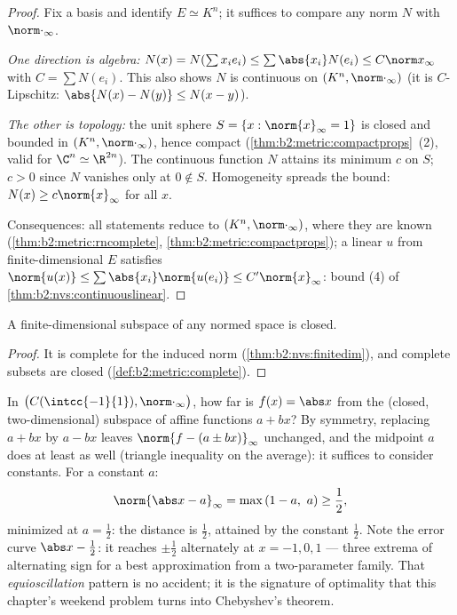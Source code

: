 \begin{proof}
Fix a basis and identify $E \simeq K^n$; it suffices to compare any
norm $N$ with $\norm\cdot_\infty$.

\emph{One direction is algebra:} $N(x) = N(\sum x_i e_i) \leq
\sum \abs{x_i} N(e_i) \leq C \norm x_\infty$ with $C = \sum N(e_i)$.
This also shows $N$ is continuous on $(K^n, \norm\cdot_\infty)$
(it is $C$-Lipschitz: $\abs{N(x) - N(y)} \leq N(x - y)$).

\emph{The other is topology:} the unit sphere $S = \{x :
\norm{x}_\infty = 1\}$ is closed and bounded in $(K^n,
\norm\cdot_\infty)$, hence compact
(\cref{thm:b2:metric:compactprops}~(2), valid for $\C^n \simeq
\R^{2n}$). The continuous function $N$ attains its minimum $c$ on
$S$; $c > 0$ since $N$ vanishes only at $0 \notin S$. Homogeneity
spreads the bound: $N(x) \geq c \norm{x}_\infty$ for all $x$.

Consequences: all statements reduce to $(K^n,
\norm\cdot_\infty)$, where they are known
(\cref{thm:b2:metric:rncomplete},
\cref{thm:b2:metric:compactprops}); a linear $u$ from
finite-dimensional $E$ satisfies $\norm{u(x)} \leq \sum\abs{x_i}
\norm{u(e_i)} \leq C'\norm{x}_\infty$: bound (4) of
\cref{thm:b2:nvs:continuouslinear}.
\end{proof}

\begin{corollary}\label{cor:b2:nvs:closedsubspace}
A finite-dimensional subspace of any normed space is closed.
\end{corollary}

\begin{proof}
It is complete for the induced norm
(\cref{thm:b2:nvs:finitedim}), and complete subsets are closed
(\cref{def:b2:metric:complete}).
\end{proof}

\begin{example}\label{ex:b2:nvs:bestaffine}
In $\bigl(C(\intcc{-1}{1}), \norm\cdot_\infty\bigr)$, how far is
$f(x) = \abs x$ from the (closed, two-dimensional) subspace of
affine functions $a + bx$? By symmetry, replacing $a + bx$ by
$a - bx$ leaves $\norm{f - (a \pm bx)}_\infty$ unchanged, and
the midpoint $a$ does at least as well (triangle inequality on
the average): it suffices to consider constants. For a constant
$a$:
\[
\norm{\abs x - a}_\infty = \max\,(1 - a,\ a)
\geq \frac12 ,
\]
minimized at $a = \frac12$: the distance is $\frac12$, attained
by the constant $\frac12$. Note the error curve $\abs x -
\frac12$: it reaches $\pm\frac12$ alternately at $x = -1, 0,
1$ --- three extrema of alternating sign for a best
approximation from a two-parameter family. That
\emph{equioscillation} pattern is no accident; it is the
signature of optimality that this chapter's weekend problem
turns into Chebyshev's theorem.
\end{example}

